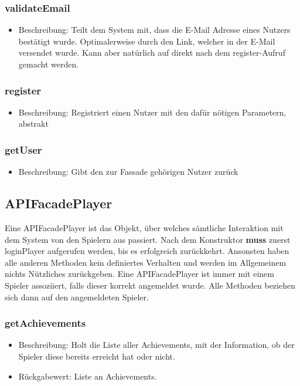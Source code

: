 \documentclass[a4paper]{scrreprt}
\begin{document}
		\subsubsection{validateEmail}
		    \begin{itemize}
		        \item Beschreibung: Teilt dem System mit, dass die E-Mail Adresse eines Nutzers bestätigt wurde. Optimalerweise durch den Link, welcher in der E-Mail versendet wurde. Kann aber natürlich auf direkt nach dem register-Aufruf gemacht werden.
		    \end{itemize}
	\subsubsection{register}
	\begin{itemize}
	\item Beschreibung: Registriert einen Nutzer mit den dafür nötigen Parametern, abstrakt
	\end{itemize}
	\subsubsection{getUser}
	\begin{itemize}
	\item Beschreibung: Gibt den zur Fassade gehörigen Nutzer zurück
	\end{itemize}
	
	\subsection{APIFacadePlayer}
	Eine APIFacadePlayer ist das Objekt, über welches sämtliche Interaktion mit dem System von den Spielern aus passiert. Nach dem Konstruktor \textbf{muss} zuerst loginPlayer aufgerufen werden, bis es erfolgreich zurückkehrt. Ansonsten haben alle anderen Methoden kein definiertes Verhalten und werden im Allgemeinem nichts Nützliches zurückgeben. Eine APIFacadePlayer ist immer mit einem Spieler assoziiert, falls dieser korrekt angemeldet wurde. Alle Methoden beziehen sich dann auf den angemeldeten Spieler.
	
	\subsubsection{getAchievements}
	\begin{itemize}
		\item Beschreibung: Holt die Liste aller Achievements, mit der Information, ob der Spieler diese bereits erreicht hat oder nicht.
		\item Rückgabewert: Liste an Achievements.
	\end{itemize}
\end{document}
